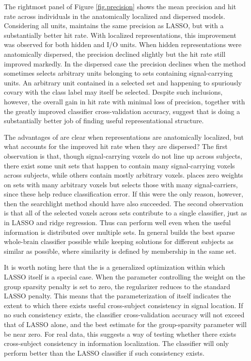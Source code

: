 The rightmost panel of Figure \ref{fig.precision} shows the mean precision and hit rate across individuals in the anatomically localized and dispersed models. Considering all units, \soslasso maintains the same precision as LASSO, but with a substantially better hit rate. With localized representations, this improvement was observed for both hidden and I/O units. When hidden representations were anatomically dispersed, the precision declined slightly but the hit rate still improved markedly. In the dispersed case the precision declines when the method sometimes selects arbitrary units belonging to sets containing signal-carrying units. An arbitrary unit contained in a selected set and happening to spuriously covary with the class label may itself be selected. Despite such inclusions, however, the overall gain in hit rate with minimal loss of precision, together with the greatly improved classifier cross-validation accuracy, suggest that \soslasso is doing a substantially better job of finding useful representational structure.

The advantages of \soslasso are clear when representations are anatomically localized, but what accounts for the improved hit rate when they are dispersed? The first observation is that, though signal-carrying voxels do not line up across subjects, there exist some unit sets that happen to contain many signal-carrying voxels across subjects, while others contain mostly arbitrary voxels. \soslasso places zero weights on sets with many arbitrary voxels but selects those with many signal-carriers, since these help reduce classification error. If this were the only reason, however, then the searchlight method should have also succeeded. The second observation is that all of the selected voxels across sets contribute to a single classifier, just as in LASSO and ridge regression. Thus \soslasso can perform well even when the useful information is distributed over multiple sets. In general \soslasso builds the best sparse whole-brain classifier possible while keeping solutions for different subjects as similar as possible, where similarity is defined by membership in the same set.

It is worth noting here that the \soslasso is a generalized optimization within which LASSO itself is a special case. When the parameter controlling the weight on the group sparsity penalty is set to zero, the regularizer reduces to the standard LASSO penalty. This means that the parameterization of \soslasso itself indicates the extent to which there exists useful cross-subject consistency in signal location. If no such consistency exists, the classifier cross-validation accuracy will not exceed that of LASSO alone, and the best estimate for the group-sparsity parameter will be near zero. For real data, this suggests a way of testing whether there exists cross-subject consistency in information localization. The \soslasso classifier will only perform better than the LASSO classifier if such consistency exists.

